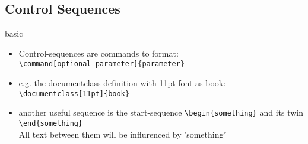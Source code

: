 \documentclass[handout]{beamer}
\begin{document}
    \subsection{Control Sequences}
        \begin{frame}[fragile]{basic}
			\begin{itemize}
				\item<1-> Control-sequences are commands to format: \\
                    \verb!\command[optional parameter]{parameter}!
                \item<2-> e.g. the documentclass definition with 11pt font as book: \\
                    \verb!\documentclass[11pt]{book}!
                \item<3-> another useful sequence is the start-sequence \verb!\begin{something}!
                          and its twin \verb!\end{something}! \\
                          All text between them will be influrenced by 'something'
            \end{itemize}
		\end{frame}
\end{document}
